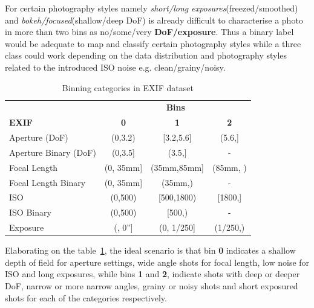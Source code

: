 For certain photography styles namely \textit{short/long exposures}(freezed/smoothed) and \textit{bokeh/focused}(shallow/deep DoF) is already difficult to characterise a photo in more than two bins as no/some/very \textbf{DoF/exposure}. Thus a binary label would be adequate to map and classify certain photography styles while a three class could work depending on the data distribution and photography styles related to the introduced ISO noise e.g. clean/grainy/noisy.


\begin{table}[!ht]
\centering
\begin{tabular}{c|c|c|c|}
\cline{2-4}
        & \multicolumn{3}{c|}{\textbf{Bins}}    \\ \cline{1-4}
        \multicolumn{1}{|l|}{\textbf{EXIF}}  & \textbf{0}       &  \textbf{1}       & \textbf{2}  \\ \cline{1-4}
        \multicolumn{1}{|l|}{Aperture (DoF)}            & (0,3.2)          &  [3.2,5.6]        & (5.6,]  \\ \cline{1-4}
        \multicolumn{1}{|l|}{Aperture Binary (DoF)}        & (0,3.5]          &  (3.5,]           & -  \\ \cline{1-4}
        \multicolumn{1}{|l|}{Focal Length}   & (0, 35mm]        &  (35mm,85mm]      & (85mm, )    \\ \cline{1-4}
        \multicolumn{1}{|l|}{Focal Length Binary}  & (0, 35mm]     &  (35mm,)          & -    \\ \cline{1-4}
        \multicolumn{1}{|l|}{ISO}            & (0,500)          &  [500,1800)       & [1800,]    \\ \cline{1-4}
        \multicolumn{1}{|l|}{ISO Binary}     & (0,500)          &  [500,)           & -    \\ \cline{1-4}
        \multicolumn{1}{|l|}{Exposure}       & (, 0'']              &  (0, 1/250]       & (1/250,)   \\ \cline{1-4}
\end{tabular}
\caption{Binning categories in EXIF dataset}
\label{c4:table_binning}
\end{table}

Elaborating on the table~\ref{c4:table_binning}, the ideal scenario is that bin \textbf{0} indicates a shallow depth of field for aperture settings, wide angle shots for focal length, low noise for ISO and long exposures, while bins \textbf{1} and \textbf{2}, indicate shots with deep or deeper DoF, narrow or more narrow angles, grainy or noisy shots and short exposured shots for each of the categories respectively.

